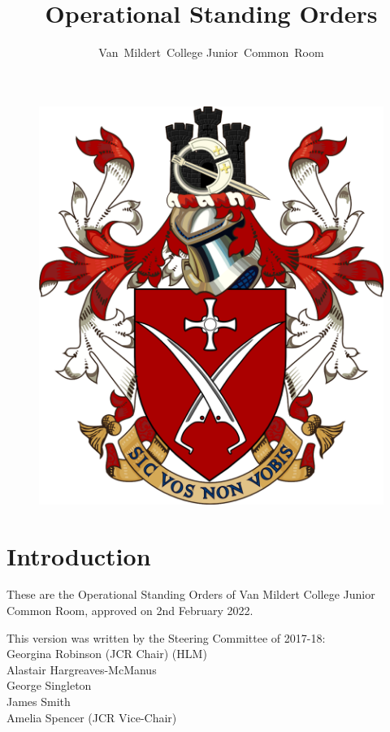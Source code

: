 \documentclass[12pt]{article}
\title{Operational Standing Orders}
\author{Van~Mildert~College Junior~Common~Room}
\date{\thedate}
\newcommand{\thedate}{2nd February 2022}
\begin{document}
\begin{titlepage}  %
    \maketitle
    \begin{figure}[h]
    \includegraphics[scale=0.25]{arms}  %
    \centering
    \end{figure}
    \thispagestyle{empty}
\end{titlepage}

\setcounter{page}{2}  %
\section*{Introduction}
These are the Operational Standing Orders of Van Mildert College Junior Common Room, approved on \thedate.

This version was written by the Steering Committee of 2017-18:\\
\hspace*{2cm}Georgina Robinson (JCR Chair) (HLM)\\
\hspace*{2cm}Alastair Hargreaves-McManus\\
\hspace*{2cm}George Singleton\\
\hspace*{2cm}James Smith\\
\hspace*{2cm}Amelia Spencer (JCR Vice-Chair)
\end{document}
